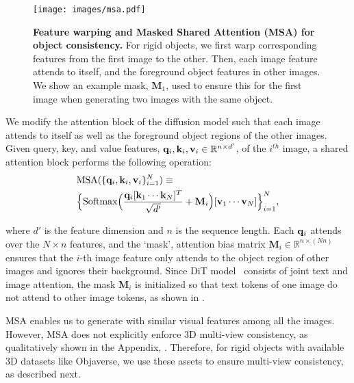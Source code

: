 \begin{figure}[!t]
    \centering
    \texttt{[image: images/msa.pdf]}
    \caption{{\textbf{Feature warping and Masked Shared Attention (MSA) for object consistency.}  For rigid objects, we first warp corresponding features from the first image to the other. Then, each image feature attends to itself, and the foreground object features in other images. We show an example mask, $\mathbf{M}_1$, used to ensure this for the first image when generating two images with the same object. 
    }
    }
    \vspace{-15pt}
\end{figure}

 We modify the attention block of the diffusion model such that each image attends to itself as well as the foreground object regions of the other images. Given query, key, and value features, ${\mathbf{q}}_i, {\mathbf{k}}_i, {\mathbf{v}}_i \in \mathbb{R}^{n \times d'} $, of the $i^{th}$ image, a shared attention block performs the following operation:
\begin{equation}
    \begin{aligned}
    & \text{MSA}(\{\q_i, \k_i, \v_i\}_{i=1}^{N}) \equiv \\ &  \Big \{ \text{Softmax}\Big(\frac{\q_i [\k_1 \cdots \k_N]^T}{\sqrt{d'}} + \mathbf{M}_i \Big)[\v_1 \cdots \v_N] \Big \}_{i=1}^{N},\\
    \end{aligned}\lbleq{msa}
\end{equation}



where $d'$ is the feature dimension and $n$ is the sequence length. Each ${\mathbf{q}}_i$ attends over the $N \times n$ features, and the `mask', \ie attention bias matrix $\mathbf{M}_i \in \mathbb{R}^{n \times (Nn)}$ ensures that the $i$-th image feature only attends to the object region of other images and ignores their background. Since DiT model~\cite{peebles2023scalable} consists of joint text and image attention, the mask $\mathbf{M}_i$ is initialized so that text tokens of one image do not attend to other image tokens, as shown in .

MSA enables us to generate  with similar visual features among all the images. However, MSA does not explicitly enforce 3D multi-view consistency, as qualitatively shown in the Appendix, . Therefore, for rigid objects with available 3D datasets like Objaverse, we use these assets to ensure multi-view consistency, as described next.







